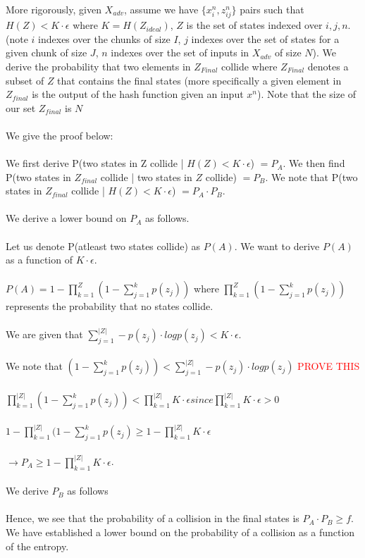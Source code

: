 \documentclass[letterpaper,twocolumn,10pt]{article}
\begin{document}
More rigorously, given $X_{adv}$, assume we have $\{x_{i}^{n}, z_{ij}^{n}\}$ pairs such that $H(Z) < K \cdot \epsilon$ where $K = H(Z_{ideal})$, $Z$ is the set of states indexed over $i, j, n$. (note $i$ indexes over the chunks of size $I$, $j$ indexes over the set of states for a given chunk of size $J$, $n$ indexes over the set of inputs in $X_{adv}$ of size $N$). We derive the probability that two elements in $Z_{Final}$ collide where $Z_{Final}$ denotes a subset of $Z$ that contains the final states (more specifically a given element in $Z_{final}$ is the output of the hash function given an input $x^{n}$). Note that the size of our set $Z_{final}$ is $N$ 
\\
\\
We give the proof below:
\\
\\
We first derive P(two states in Z collide | $H(Z) < K \cdot \epsilon$) $= P_{A}$. We then find P(two states in $Z_{final}$ collide | two states in $Z$ collide) $= P_{B}$. We note that P(two states in $Z_{final}$ collide |  $H(Z) < K \cdot \epsilon$) $=  P_{A} \cdot P_{B}$. 
\\
\\
We derive a lower bound on $P_{A}$ as follows.
\\
\\
Let us denote P(atleast two states collide) as $P(A)$. We want to derive $P(A)$ as a function of $K \cdot \epsilon$. 
\\
\\
$P(A) = 1 - \prod_{k=1}^{Z} (1- \sum_{j=1}^{k} p(z_{j}))$ where $\prod_{k=1}^{Z} (1- \sum_{j=1}^{k} p(z_{j}))$ represents the probability that no states collide. 
\\
\\
We are given that $\sum_{j=1}^{|Z|} -p(z_{j}) \cdot log p(z_{j}) < K \cdot \epsilon$. 
\\
\\
We note that $(1 - \sum_{j=1}^{k} p(z_{j})) < \sum_{j=1}^{|Z|} -p(z_{j}) \cdot log p(z_{j})$ \textcolor{red}{PROVE THIS}
\\
\\
$ \prod_{k=1}^{|Z|} (1 - \sum_{j=1}^{k} p(z_{j})) < \prod_{k=1}^{|Z|} K \cdot \epsilon$$ since $$\prod_{k=1}^{|Z|} K \cdot \epsilon > 0$
\\
\\
$ 1 - \prod_{k=1}^{|Z|} (1 - \sum_{j=1}^{k} p(z_{j}) \geq 1 - \prod_{k=1}^{|Z|} K \cdot \epsilon$
\\
\\
$\rightarrow P_{A} \geq 1 - \prod_{k=1}^{|Z|} K \cdot \epsilon$. 
\\
\\
We derive $P_{B}$ as follows
\\
\\
Hence, we see that the probability of a collision in the final states is $P_{A} \cdot P_{B} \geq f$. We have established a lower bound on the probability of a collision as a function of the entropy.
\end{document}
